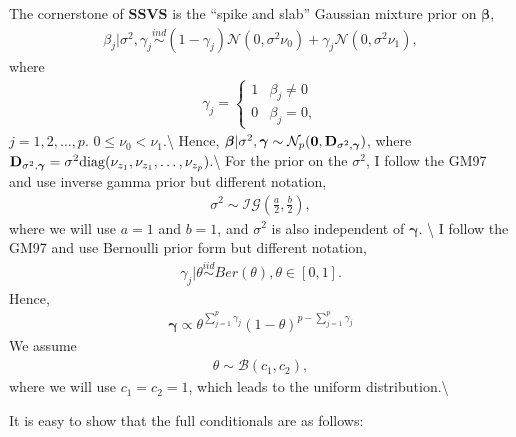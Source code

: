 \documentclass[]{book}
\begin{document}
The cornerstone of \(\textbf{SSVS}\) is the ``spike and slab'' Gaussian mixture prior on \({\boldsymbol \beta}\),
\begin{eqnarray}
    \beta_j|\sigma^2,\gamma_j \stackrel{ind}{\sim} (1-\gamma_j) \mathcal{N}(0, \sigma^2\nu_0) + \gamma_j\mathcal{N}(0,\sigma^2\nu_1),
    \end{eqnarray}
where
\begin{eqnarray*}
        \gamma_j=\left\{
        \begin{array}{lcr}
            1 & \beta_j \neq 0\\
            0 & \beta_j=0,
\end{array}\right.
\label{eq:spike-slab}
\end{eqnarray*}
\(j=1,2,\ldots, p\). \(0\leq \nu_0<\nu_1\).\textbackslash{}
Hence, \({\boldsymbol \beta}|\sigma^2,{\boldsymbol \gamma}\sim \mathcal{N}_p({\bf 0},{\bf D}_{\sigma^2,{\boldsymbol \gamma}})\), where \({\bf D}_{\sigma^2,{\boldsymbol \gamma}} = \sigma^2  {\rm diag}(\nu_{z_1},\nu_{z_1},\ldots,\nu_{z_p})\).\textbackslash{}
For the prior on the \(\sigma^2\), I follow the GM97 and use inverse gamma prior but different notation,
\begin{eqnarray}
    \sigma^2 \sim \mathcal{IG}(\frac{a}{2}, \frac{b}{2}),
    \end{eqnarray}
where we will use \(a=1\) and \(b=1\), and \(\sigma^2\) is also independent of \({\boldsymbol \gamma}\). \textbackslash{}
I follow the GM97 and use Bernoulli prior form but different notation,
\begin{eqnarray}
    \gamma_j|\theta \stackrel{iid}{\sim} Ber(\theta), \theta \in [0,1].
    \end{eqnarray}
Hence,
\begin{eqnarray}\label{gamma}
    {\boldsymbol \gamma}\propto \theta^{\sum_{j=1}^{p}\gamma_j}(1-\theta)^{p-\sum_{j=1}^{p}\gamma_j} 
    \label{eq:gamma}
    \end{eqnarray}
We assume
\begin{eqnarray}
    \theta \sim \mathcal{B}(c_1,c_2),
    \end{eqnarray}
where we will use \(c_1=c_2=1\), which leads to the uniform distribution.\textbackslash{}

It is easy to show that the full conditionals are as follows:
\end{document}
